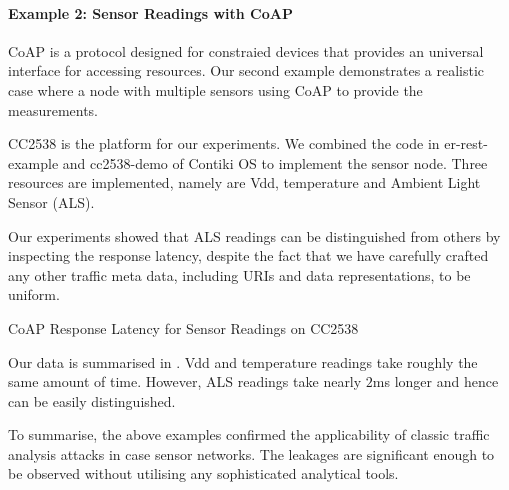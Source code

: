 \paragraph{Example 2: Sensor Readings with CoAP}
CoAP\cite{rfc7252} is a protocol designed for constraied devices that provides an universal interface for accessing resources. Our second example demonstrates a realistic case where a node with multiple sensors using CoAP\cite{rfc7252} to provide the measurements.

CC2538 is the platform for our experiments. We combined the code in er-rest-example and cc2538-demo of Contiki OS to implement the sensor node. Three resources are implemented, namely are Vdd, temperature and Ambient Light Sensor (ALS).

Our experiments showed that ALS readings can be distinguished from others by inspecting the response latency, despite the fact that we have carefully crafted any other traffic meta data, including URIs and data representations, to be uniform.

\begin{table}
	\center
	
	\caption{CoAP Response Latency for Sensor Readings on CC2538\label{CoapTiming}}
\end{table}

Our data is summarised in . Vdd and temperature readings take roughly the same amount of time. However, ALS readings take nearly $2$ms longer and hence can be easily distinguished.

To summarise, the above examples confirmed the applicability of classic traffic analysis attacks in case sensor networks. The leakages are significant enough to be observed without utilising any sophisticated analytical tools.
